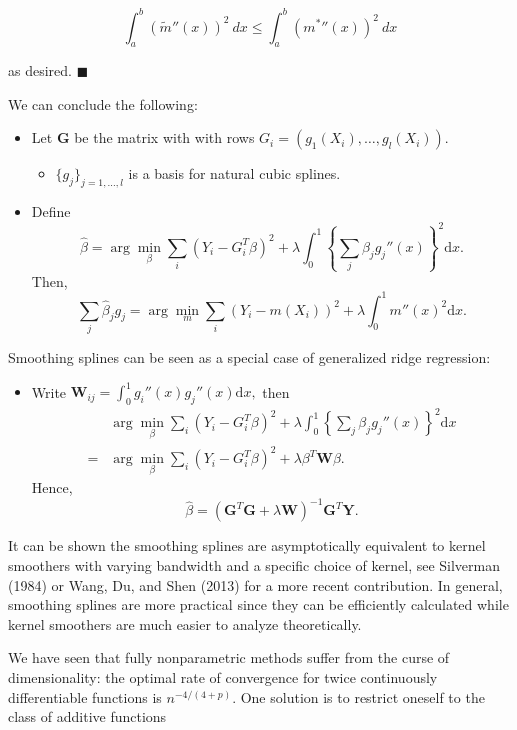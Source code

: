 \documentclass[a4paper,10pt,openany]{book}
\providecommand{\tightlist}{%
 \setlength{\itemsep}{0pt}\setlength{\parskip}{0pt}}
\begin{document}
\[
\int_a^b(\tilde m''(x))^2\ dx\le \int_a^b({m^*}''(x))^2\ dx
\]

as desired. \(\blacksquare\)

We can conclude the following:

\begin{itemize}
\tightlist
\item
  Let \(\mathbf G\) be the matrix with with rows \(G_i=(g_1(X_i), \dots, g_l(X_i))\).

  \begin{itemize}
  \tightlist
  \item
    \(\{g_j\}_{j=1,\dots,l}\) is a basis for natural cubic splines.
  \end{itemize}
\item
  Define
  \[\hat \beta  = \arg\min_{\beta} \sum_i (Y_i- G_i^T\beta)^2+\lambda\int_0^1 \left\{{\sum_j \beta_jg_j''}(x)\right\}^2\mathrm dx.\]
  Then,
  \[\sum_j \hat \beta_j g_j=\arg\min_{m} \sum_i (Y_i-m(X_i))^2+\lambda\int_0^1 m''(x)^2\mathrm dx.\]
\end{itemize}

Smoothing splines can be seen as a special case of generalized ridge regression:

\begin{itemize}
\tightlist
\item
  Write \(\mathbf W_{ij}=\int_0^1g_i''(x)g_j''(x)\mathrm dx,\) then
  \begin{align*}
    &\arg\min_{\beta} \sum_i (Y_i- G_i^T\beta)^2+\lambda\int_0^1 \left\{{\sum_j \beta_jg_j''}(x)\right\}^2\mathrm dx\\=
    &\arg\min_{\beta} \sum_i (Y_i- G_i^T\beta)^2+\lambda \beta^T \mathbf W \beta.
    \end{align*}
  Hence,
  \[
    \hat \beta= (\mathbf G^T\mathbf G+\lambda \mathbf W)^{-1}\mathbf G^T\mathbf Y.
    \]
\end{itemize}

It can be shown the smoothing splines are asymptotically equivalent to kernel smoothers with varying bandwidth and a specific choice of kernel, see Silverman (1984) or Wang, Du, and Shen (2013) for a more recent contribution. In general, smoothing splines are more practical since they can be efficiently calculated while kernel smoothers are much easier to analyze theoretically.

We have seen that fully nonparametric methods suffer from the curse of dimensionality: the optimal rate of convergence for twice continuously differentiable functions is \(n^{-4/(4+p)}\). One solution is to restrict oneself to the class of additive functions
\end{document}
